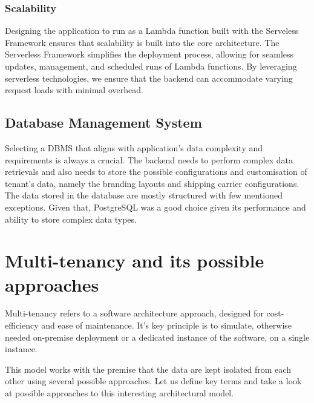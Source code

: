 \subsubsection{Scalability}
Designing the application to run as a Lambda function built with the Serveless Framework ensures that scalability is built into the core architecture.
The Serverless Framework simplifies the deployment process, allowing for seamless updates, management, and scheduled runs of Lambda functions.
By leveraging serverless technologies, we ensure that the backend can accommodate varying request loads with minimal overhead.



\subsection{Database Management System}
\label{subsec:dbms}
Selecting a \ac{DBMS} that aligns with application's data complexity and requirements is always a crucial. 
The backend needs to perform complex data retrievals and also needs to store the possible configurations and customisation of tenant's data, namely the branding layouts and shipping carrier configurations.
The data stored in the database are mostly structured with few mentioned exceptions.
Given that, PostgreSQL was a good choice given its performance and ability to store complex data types.

\section{Multi-tenancy and its possible approaches}
\label{sec:different-approaches-for-multitanency}
Multi-tenancy refers to a software architecture approach, designed for cost-efficiency and ease of maintenance.
It's key principle is to simulate, otherwise needed on-premise deployment or a dedicated instance of the software, on a single instance.

This model works with the premise that the data are kept isolated from each other using several possible approaches.
Let us define key terms and take a look at possible approaches to this interesting architectural model.


